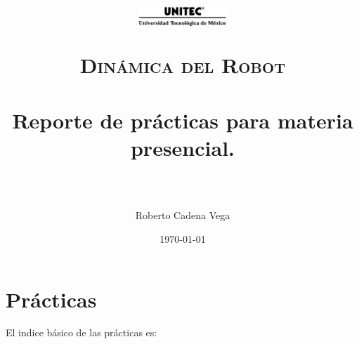 



\title{
	\normalfont \normalsize
	\begin{figure}[h]
		\begin{center}
			\includegraphics[width=0.3\textwidth]{../images/UNITEC.png}
		\end{center}
	\end{figure}
	\textsc{Dinámica del Robot} \\ [25pt]
	\horrule{0.5pt} \\[0.4cm] %
	\huge Reporte de prácticas para materia presencial. \\ %
	\horrule{2pt} \\[0.5cm] %
}

\author{Roberto Cadena Vega} %

\date{\normalsize \today} %




\maketitle %


\section{Prácticas}

	El indice básico de las prácticas es:

